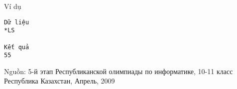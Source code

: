 Ví dụ
\begin{verbatim}
Dữ liệu
*LS		

Kết quả
55
\end{verbatim}

   Nguồn: 5-й этап Республиканской олимпиады по информатике, 10-11 класс Республика Казахстан, Апрель, 2009